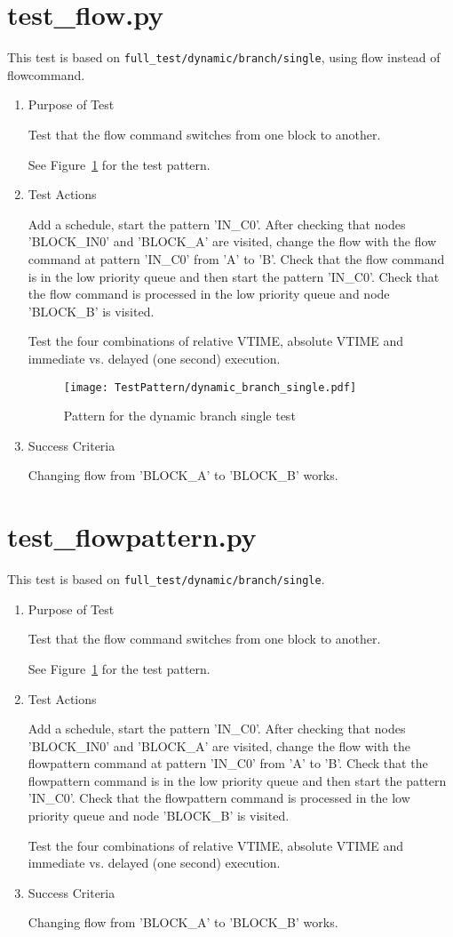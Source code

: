 \documentclass[12pt,a4paper]{report}
\begin{document}
\section{test\_flow.py}
This test is based on \texttt{full\_test/dynamic/branch/single}, using flow instead of flowcommand.
\begin{enumerate}
	\item Purpose of Test

	Test that the flow command switches from one block to another.

	See Figure~\ref{fig:Pattern_for_the_dynamic_branch_single_test} for the test pattern.
	\item Test Actions

	Add a schedule, start the pattern 'IN\_C0'. After checking that nodes 'BLOCK\_IN0' and 'BLOCK\_A' are visited,
        change the flow with the flow command at pattern 'IN\_C0' from 'A' to 'B'. Check that the flow
        command is in the low priority queue and then start the pattern 'IN\_C0'. Check that the flow
        command is processed in the low priority queue and node 'BLOCK\_B' is visited.

  Test the four combinations of relative VTIME, absolute VTIME and immediate vs. delayed (one second) execution.
    \begin{figure}
        \centering
        \texttt{[image: TestPattern/dynamic\_branch\_single.pdf]}
        \caption{Pattern for the dynamic branch single test}
        \label{fig:Pattern_for_the_dynamic_branch_single_test}
    \end{figure}
	\item Success Criteria

	Changing flow from 'BLOCK\_A' to 'BLOCK\_B' works.
\end{enumerate}
\section{test\_flowpattern.py}
This test is based on \texttt{full\_test/dynamic/branch/single}.
\begin{enumerate}
	\item Purpose of Test

	Test that the flow command switches from one block to another.

	See Figure~\ref{fig:Pattern_for_the_dynamic_branch_single_test} for the test pattern.
	\item Test Actions

	Add a schedule, start the pattern 'IN\_C0'. After checking that nodes 'BLOCK\_IN0' and 'BLOCK\_A' are visited,
        change the flow with the flowpattern command at pattern 'IN\_C0' from 'A' to 'B'. Check that the flowpattern
        command is in the low priority queue and then start the pattern 'IN\_C0'. Check that the flowpattern
        command is processed in the low priority queue and node 'BLOCK\_B' is visited.

  Test the four combinations of relative VTIME, absolute VTIME and immediate vs. delayed (one second) execution.
	\item Success Criteria

	Changing flow from 'BLOCK\_A' to 'BLOCK\_B' works.
\end{enumerate}
\end{document}
